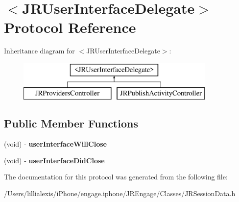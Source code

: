 \hypertarget{protocol_j_r_user_interface_delegate-p}{
\section{$<$JRUserInterfaceDelegate$>$ Protocol Reference}
\label{protocol_j_r_user_interface_delegate-p}
}
Inheritance diagram for $<$JRUserInterfaceDelegate$>$:\begin{figure}[H]
\begin{center}
\leavevmode
\includegraphics[height=2.000000cm]{protocol_j_r_user_interface_delegate-p}
\end{center}
\end{figure}
\subsection*{Public Member Functions}
\begin{DoxyCompactItemize}
\item 
\hypertarget{protocol_j_r_user_interface_delegate-p_ab370a5b812c4cc378bcce952830fad41}{
(void) -\/ {\bfseries userInterfaceWillClose}}
\label{protocol_j_r_user_interface_delegate-p_ab370a5b812c4cc378bcce952830fad41}

\item 
\hypertarget{protocol_j_r_user_interface_delegate-p_a95a66a294de53b43db01bd6dd24b6911}{
(void) -\/ {\bfseries userInterfaceDidClose}}
\label{protocol_j_r_user_interface_delegate-p_a95a66a294de53b43db01bd6dd24b6911}

\end{DoxyCompactItemize}


The documentation for this protocol was generated from the following file:\begin{DoxyCompactItemize}
\item 
/Users/lillialexis/iPhone/engage.iphone/JREngage/Classes/JRSessionData.h\end{DoxyCompactItemize}
